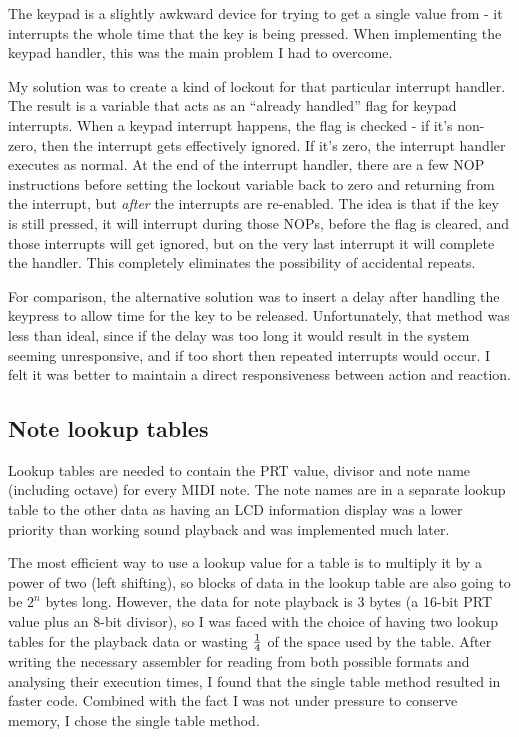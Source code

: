 \documentclass[a4paper,10pt]{article}
\begin{document}
The keypad is a slightly awkward device for trying to get a single value from - it interrupts the 
whole time that the key is being pressed.  When implementing the keypad handler, this was the main 
problem I had to overcome.

My solution was to create a kind of lockout for that particular interrupt handler.  The result is a 
variable that acts as an ``already handled'' flag for keypad interrupts.  When a keypad interrupt 
happens, the flag is checked - if it's non-zero, then the interrupt gets effectively ignored.  If 
it's zero, the interrupt handler executes as normal.  At the end of the interrupt handler, there are 
a few NOP instructions before setting the lockout variable back to zero and returning from the 
interrupt, but \emph{after} the interrupts are re-enabled.  The idea is that if the key is still 
pressed, it will interrupt during those NOPs, before the flag is cleared, and those interrupts will 
get ignored, but on the very last interrupt it will complete the handler.  This completely 
eliminates the possibility of accidental repeats.

For comparison, the alternative solution was to insert a delay after handling the keypress to allow 
time for the key to be released.  Unfortunately, that method was less than ideal, since if the delay 
was too long it would result in the system seeming unresponsive, and if too short then repeated 
interrupts would occur.  I felt it was better to maintain a direct responsiveness between action and 
reaction.

\subsection{Note lookup tables}
\label{notelookuptables}

Lookup tables are needed to contain the PRT value, divisor and note name (including octave) for 
every MIDI note.  The note names are in a separate lookup table to the other data as having an LCD 
information display was a lower priority than working sound playback and was implemented much later.

The most efficient way to use a lookup value for a table is to multiply it by a power of two (left 
shifting), so blocks of data in the lookup table are also going to be $2^n$ bytes long.  However, 
the data for note playback is 3 bytes (a 16-bit PRT value plus an 8-bit divisor), so I was faced 
with the choice of having two lookup tables for the playback data or wasting $1\over4$ of the space 
used by the table.  After writing the necessary assembler for reading from both possible formats and 
analysing their execution times, I found that the single table method resulted in faster code.  
Combined with the fact I was not under pressure to conserve memory, I chose the single table method.
\end{document}
